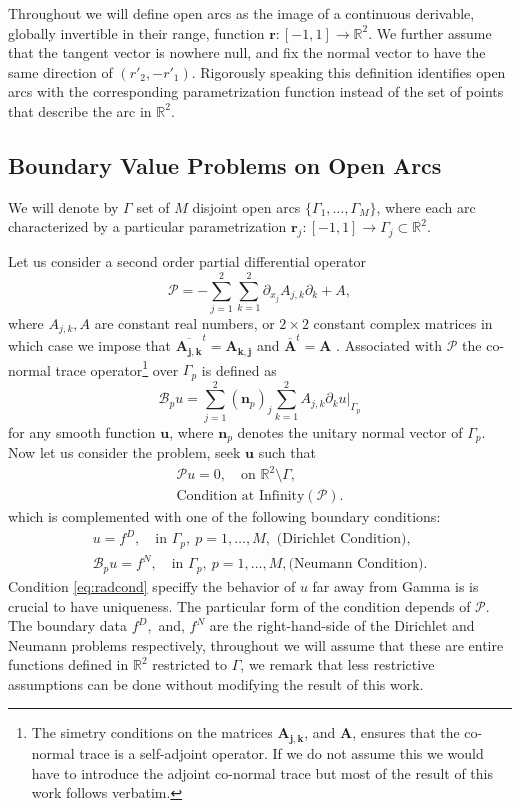 \documentclass{article}
\newcommand{\cB}{\mathcal B}
\newcommand{\IR}{{\mathbb R}}
\newcommand{\cP}{\mathcal{P}}
\newcommand{\bn}{\bm{n}}
\newcommand{\bu}{\bm{u}}
\newcommand{\br}{\bm{r}}
\begin{document}
Throughout we will define open arcs as the image of a continuous derivable, globally invertible in their range, function $\br : [-1,1] \rightarrow \IR^2$.  We further assume that the tangent vector is nowhere null, and fix the normal vector to have the same direction of $(r'_2,-r'_1)$. Rigorously speaking  this definition identifies open arcs with the corresponding parametrization function instead of the set of points that describe the arc in $\IR^2$. 
\subsection{Boundary Value Problems on Open Arcs}
\label{sec:bvproblem}
We will denote by $\Gamma$ set of $M$ disjoint open arcs $ \{ \Gamma_1, \hdots, \Gamma_M\}$, where  each arc characterized by a particular parametrization $\br_j :[-1,1] \rightarrow \Gamma_j \subset \IR^2$.

Let us consider a second order partial differential operator 
$$\cP = - \sum_{j=1}^2 \sum_{k=1}^2 \partial_{x_j}{A_{j,k}} \partial_k  + {A},$$
where ${A_{j,k}},{A}$ are constant real numbers, or $2\times 2$ constant complex matrices in which case we impose that $\overline{\mathbf{A_{j,k}}}^t = \mathbf{A_{k,j}}$ and $\overline{\mathbf{A}}^t = \mathbf{A}$ . Associated with $\cP$ the co-normal trace operator\footnote{The simetry conditions on the matrices $\mathbf{A_{j,k}}$, and $\mathbf{A}$, ensures that the co-normal trace is a self-adjoint operator. If we do not assume this we would have to introduce the adjoint co-normal trace but most of the result of this work follows verbatim.} over $\Gamma_p$ is defined as 
$$
\cB_p u =  \sum_{j=1}^2 (\bn_p)_j \sum_{k=1}^2 {A}_{j,k} \partial_k u \vert_{\Gamma_p} 
$$
for any smooth function $\bu$, where $\bn_p$ denotes the unitary normal vector of $\Gamma_p$. Now let us consider the problem, seek $\bu$ such that 
\begin{align}
\label{eq:volprob}
\cP u = 0, \quad \text{on } \IR^2 \setminus \Gamma,\\
\label{eq:radcond}
\text{Condition at Infinity}(\cP). 
\end{align}
which is complemented with one of the following boundary conditions:  
\begin{align}
\label{eq:dircond}
u = f^D,   \quad \text{in } \Gamma_p, \ p =1,\hdots,M,  \text{ (Dirichlet Condition)},\\
\label{eq:neumanncond}
 \cB_p u = f^N,  \quad \text{in } \Gamma_p, \ p =1,\hdots,M,  \text{(Neumann Condition)}.
\end{align}
Condition \eqref{eq:radcond} speciffy the behavior of $u$ far away from Gamma is is crucial to have uniqueness. The particular form of the condition depends of $\cP$. The boundary data $f^D,$ and, $f^N$ are the right-hand-side of the Dirichlet and Neumann problems respectively, throughout we will assume that these are entire functions defined in $\IR^2$ restricted to $\Gamma$, we remark that less restrictive assumptions can be done without modifying the result of this work.
\end{document}
